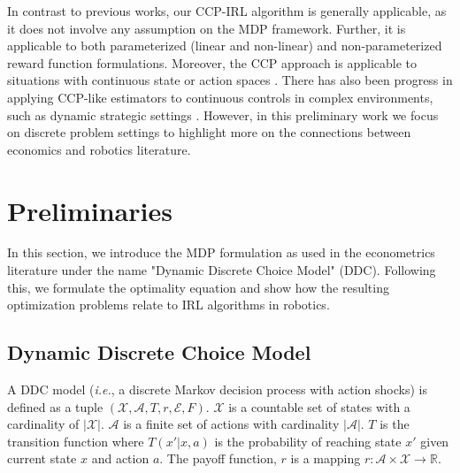 \documentclass{article}
\begin{document}

In contrast to previous works, our CCP-IRL algorithm is generally applicable, as it does not involve any assumption on the MDP framework. 
Further, it is applicable to both parameterized (linear and non-linear) and non-parameterized reward function formulations. Moreover, the CCP approach is applicable to situations with continuous state or action spaces \cite{altuug1998effect}. There has also been progress in applying CCP-like estimators to continuous controls in complex environments, such as dynamic strategic settings \cite{pesendorfer}. However, in this preliminary work we focus on discrete problem settings to highlight more on the connections between economics and robotics literature.


\section{Preliminaries}

In this section, we introduce the MDP formulation as used in the econometrics literature under the name "Dynamic Discrete Choice Model" (DDC). Following this, we formulate the optimality equation and show how the resulting optimization problems relate to IRL algorithms in robotics.

\subsection{Dynamic Discrete Choice Model}

A DDC model (\emph{i.e.}, a discrete Markov decision process with action shocks) is defined as a tuple $(\mathcal{X,A}, T,r,\mathcal{E},F)$. 
$\mathcal{X}$ is a countable set of states with a cardinality of $|\mathcal{X}|$. $\mathcal{A}$ is a finite set of actions with cardinality $|\mathcal{A}|$. $T$ is the transition function where $T(x'|x,a)$ is the probability of reaching state $x'$ given current state $x$ and action $a$. The payoff function, $r$ is a mapping $r:\mathcal{A}\times\mathcal{X}\rightarrow \mathbb{R}$.
\end{document}
